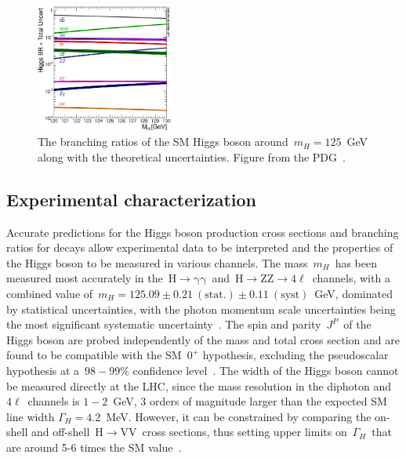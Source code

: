\begin{figure}
\begin{centering}
\includegraphics[width=0.4\textwidth]{figures/theory/higgs_br.eps}
\caption[The branching ratios of the Higgs boson]{The branching ratios of the SM Higgs boson around~$m_H = 125$~GeV along with the theoretical uncertainties. Figure from the PDG~\cite{Patrignani:2016xqp}.}
\label{fig:higgs_br}
\end{centering}
\end{figure}

\subsection{Experimental characterization}
Accurate predictions for the Higgs boson production cross sections and branching ratios for decays allow experimental data to be interpreted and the properties of the Higgs boson to be measured in various channels. The mass~$m_H$~has been measured most accurately in the~$\mathrm{H}\rightarrow\mathrm{\gamma}\mathrm{\gamma}$~and~$\mathrm{H} \rightarrow \mathrm{Z}\mathrm{Z} \rightarrow 4\ell$~channels, with a combined value of~$m_H = 125.09 \pm 0.21~(\mathrm{stat}.) \pm 0.11~(\mathrm{syst})$~GeV, dominated by statistical uncertainties, with the photon momentum scale uncertainties being the most significant systematic uncertainty~\cite{Aad:2015zhl}. The spin and parity~$J^P$~of the Higgs boson are probed independently of the mass and total cross section and are found to be compatible with the SM~$0^+$ hypothesis, excluding the pseudoscalar hypothesis at a~$98-99\%$ confidence level~\cite{Khachatryan:2014kca,Aad:2013xqa}. The width of the Higgs boson cannot be measured directly at the LHC, since the mass resolution in the diphoton and~$4\ell$~channels is $1-2$~GeV, 3 orders of magnitude larger than the expected SM line width $\Gamma_H = 4.2$~MeV. However, it can be constrained by comparing the on-shell and off-shell~$\mathrm{H} \rightarrow \mathrm{VV}$~cross sections, thus setting upper limits on~$\Gamma_H$~that are around 5-6 times the SM value~\cite{Khachatryan:2014iha}.

